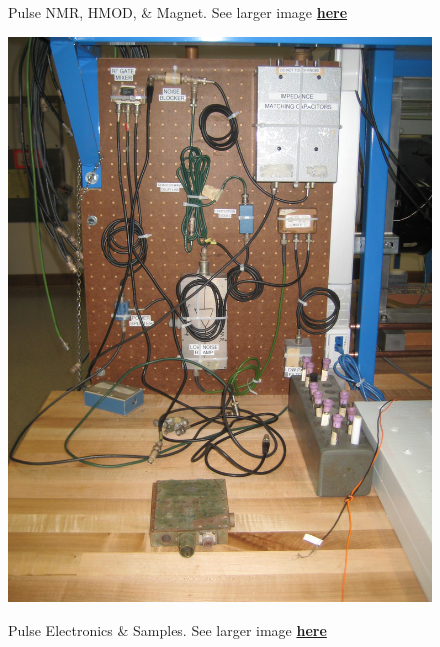 \documentclass{../lab}
\begin{document}
\begin{figure}[H]
\begin{minipage}{0.36\textwidth}
    \caption{Pulse NMR, HMOD, \& Magnet. See larger image \href{http://experimentationlab.berkeley.edu/sites/default/files/images/PNMR_3494.jpg}{\textbf{here}}}
\end{minipage}
\begin{minipage}{0.20\textwidth}
    \href{http://experimentationlab.berkeley.edu/sites/default/files/images/PNMR_3495.jpg}{\includegraphics[width=\linewidth,keepaspectratio]{images/PNMR_3495.jpg}}
    \caption{Pulse Electronics \& Samples. See larger image \href{http://experimentationlab.berkeley.edu/sites/default/files/images/PNMR_3495.jpg}{\textbf{here}}}
\end{minipage}
\end{figure}
\end{document}
